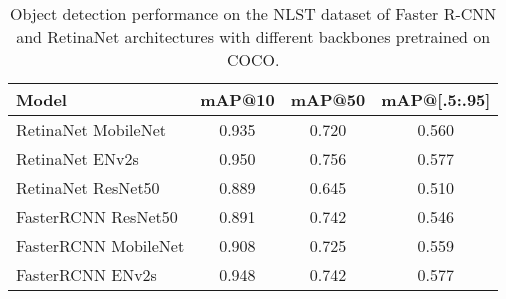 \begin{table}[h]
    \centering
    \caption{Object detection performance on the NLST dataset of Faster R-CNN and RetinaNet architectures with different backbones pretrained on COCO.}
    \label{tab:nlst-models}
    \begin{tabular}{lccc}
    \hline
    \textbf{Model} & \textbf{mAP@10} & \textbf{mAP@50} & \textbf{mAP@[.5:.95]} \\
    \hline
    RetinaNet MobileNet  & 0.935 & 0.720 & 0.560  \\
    RetinaNet ENv2s      & 0.950 & 0.756 & 0.577 \\
    RetinaNet ResNet50   & 0.889 & 0.645 & 0.510  \\
    FasterRCNN ResNet50  & 0.891 & 0.742 & 0.546  \\
    FasterRCNN MobileNet & 0.908 & 0.725 & 0.559  \\
    FasterRCNN ENv2s     & 0.948 & 0.742 & 0.577  \\
    \hline
    \end{tabular}
\end{table}